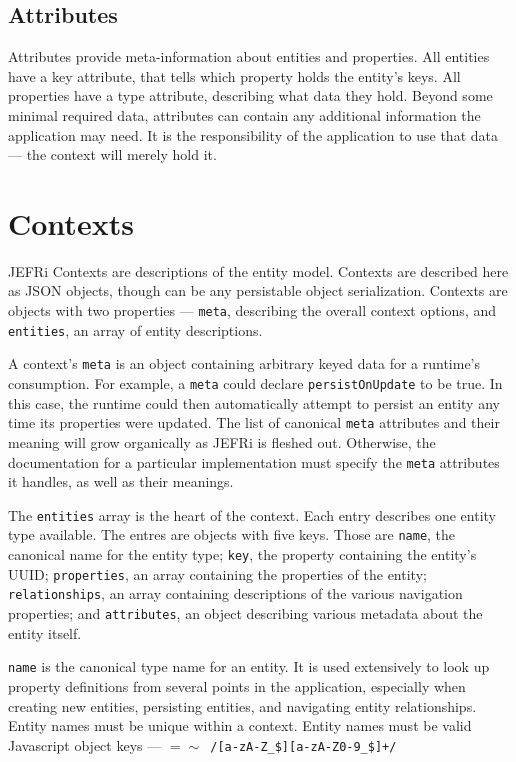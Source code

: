 \documentclass{article}
\newcommand{\ilcode}{\tt}
\begin{document}
\subsection{Attributes}

Attributes provide meta-information about entities and
properties. All entities have a key attribute, that tells which property holds
the entity's keys. All properties have a type attribute, describing what data
they hold. Beyond some minimal required data, attributes can contain any
additional information the application may need. It is the responsibility of
the application to use that data --- the context will merely hold it.

\section{Contexts}

JEFRi Contexts are descriptions of the entity model. Contexts are described here
as JSON objects, though can be any persistable object serialization. Contexts
are objects with two properties --- {\ilcode meta}, describing the overall
context options, and {\tt entities}, an array of entity descriptions.

A context's {\ilcode meta} is an object containing arbitrary keyed data for a runtime's
consumption. For example, a {\ilcode meta} could declare {\ilcode persistOnUpdate} to be true.
In this case, the runtime could then automatically attempt to persist an entity
any time its properties were updated. The list of canonical {\ilcode meta} attributes and
their meaning will grow organically as JEFRi is fleshed out. Otherwise, the
documentation for a particular implementation must specify the {\ilcode meta} attributes
it handles, as well as their meanings.

The {\ilcode entities} array is the heart of the context. Each entry describes
one entity type available. The entres are objects with five keys. Those are
{\ilcode name}, the canonical name for the entity type; {\ilcode key}, the
property containing the
entity's UUID; {\ilcode properties}, an array containing the properties of the
entity; {\ilcode relationships}, an array containing descriptions of the various
navigation properties; and {\ilcode attributes}, an object describing various
metadata about the entity itself.

{\ilcode name} is the canonical type name for an entity. It is used extensively to
look up property definitions from several points in the application, especially
when creating new entities, persisting entities, and navigating entity
relationships. Entity names must be unique within a context. Entity names must
be valid Javascript object keys ---
{\ilcode $=\sim$ /[a-zA-Z\_\$][a-zA-Z0-9\_\$]+/}
\end{document}
